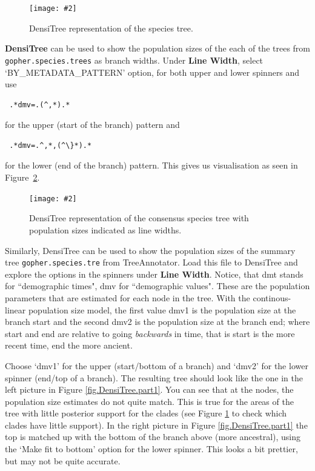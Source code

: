 \documentclass{article}
\newcommand{\includeimage}[2][]{%
\texttt{[image: \#2]}
}
\begin{document}
\begin{figure}[h]
\centering
\includeimage[scale=0.4]{figures/DensiTree}
\caption{\label{fig.DensiTree} DensiTree representation of the species tree.}
\end{figure}


{\bf DensiTree} can be used to show the population sizes of the each of the trees from \texttt{gopher.species.trees} as branch widths. 
Under {\bf Line Width}, select `BY\_METADATA\_PATTERN' option, for both upper and lower spinners and use {\begin{verbatim} .*dmv=.(^,*).*\end{verbatim}} \noindent for the upper (start of the branch) pattern and {\begin{verbatim} .*dmv=.^,*,(^\}*).*\end{verbatim}} \noindent for the lower (end of the branch) pattern.
This gives us visualisation as seen in Figure~\ref{fig.DensiTree.part3}.

\begin{figure}[h]
\centering
\includeimage[scale=0.25]{figures/species_population3}
\caption{\label{fig.DensiTree.part3} DensiTree representation of the consensus species tree with population sizes indicated as line widths.}
\end{figure}

Similarly, DensiTree can be used to show the population sizes of the summary tree \texttt{gopher.species.tre} from TreeAnnotator.
Load this file to DensiTree and explore the options in the spinners under {\bf Line Width}. Notice, that dmt stands for ``demographic times", dmv for ``demographic values". These are the population parameters that are estimated for each node in the tree. With the continous-linear population size model, the first value dmv1 is the population size at the branch start and the second dmv2 is the population size at the branch end; where start and end are relative to going {\it backwards} in time, that is start is the more recent time, end the more ancient.

Choose `dmv1' for the upper (start/bottom of a branch) and `dmv2' for the lower spinner (end/top of a branch).
The resulting tree should look like the one in the left picture in Figure \ref{fig.DensiTree.part1}. 
You can see that at the nodes, the population size estimates do not quite match.
This is true for the areas of the tree with little posterior support for the clades (see Figure \ref{fig.DensiTree} to check which clades have little support). In the right picture in Figure \ref{fig.DensiTree.part1} the top is matched up with the bottom of the branch above (more ancestral), using the `Make fit to bottom' option for the lower spinner. This looks a bit prettier, but may not be quite accurate.
\end{document}
